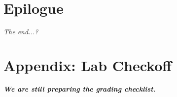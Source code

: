     \section*{Epilogue}                                                 \RangeFinderDetecting

    \textit{The end...?}

    \appendix

    \section{Appendix: Lab Checkoff}                                    %
        \textbf{\textit{We are still preparing the grading checklist.}}


